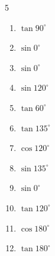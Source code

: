 \begin{multicols}{5}
\begin{enumerate}

  \item $\displaystyle \tan{90^\circ}$

        \phantom{$\displaystyle なし$}

  \item $\displaystyle \sin{0^\circ}$

        \phantom{$\displaystyle =0$}

  \item $\displaystyle \sin{0^\circ}$

        \phantom{$\displaystyle =0$}

  \item $\displaystyle \sin{120^\circ}$


  \item $\displaystyle \tan{60^\circ}$


  \item $\displaystyle \tan{135^\circ}$

        \phantom{$\displaystyle =-1$}

  \item $\displaystyle \cos{120^\circ}$


\columnbreak %

  \item $\displaystyle \sin{135^\circ}$


  \item $\displaystyle \sin{0^\circ}$

        \phantom{$\displaystyle =0$}

  \item $\displaystyle \tan{120^\circ}$


  \item $\displaystyle \cos{180^\circ}$

        \phantom{$\displaystyle =-1$}

  \item $\displaystyle \tan{180^\circ}$

        \phantom{$\displaystyle =0$}


\end{enumerate}
\end{multicols}
